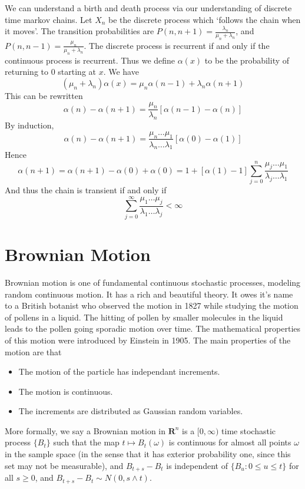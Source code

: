 We can understand a birth and death process via our understanding of discrete time markov chains. Let $X_n$ be the discrete process which `follows the chain when it moves'. The transition probabilities are $P(n,n+1) = \frac{\lambda_n}{\mu_n + \lambda_n}$, and $P(n,n-1) = \frac{\mu_n}{\mu_n + \lambda_n}$. The discrete process is recurrent if and only if the continuous process is recurrent. Thus we define $\alpha(x)$ to be the probability of returning to 0 starting at $x$. We have
%
\[ (\mu_n + \lambda_n) \alpha(x) = \mu_n \alpha(n-1) + \lambda_n \alpha(n+1) \]
%
This can be rewritten
%
\[ \alpha(n) - \alpha(n+1) = \frac{\mu_n}{\lambda_n} [\alpha(n-1) - \alpha(n)] \]
%
By induction,
%
\[ \alpha(n) - \alpha(n+1) = \frac{\mu_n \dots \mu_1}{\lambda_n \dots \lambda_1} [\alpha(0) - \alpha(1)] \]
%
Hence
%
\[ \alpha(n+1) = \alpha(n+1) - \alpha(0) + \alpha(0) = 1 + [\alpha(1) - 1] \sum_{j = 0}^n \frac{\mu_j \dots \mu_1}{\lambda_j \dots \lambda_1} \]
%
And thus the chain is transient if and only if
%
\[ \sum_{j = 0}^\infty \frac{\mu_1 \dots \mu_j}{\lambda_1 \dots \lambda_j} < \infty \]






\chapter{Brownian Motion}

Brownian motion is one of fundamental continuous stochastic processes, modeling random continuous motion. It has a rich and beautiful theory. It owes it's name to a British botanist who observed the motion in 1827 while studying the motion of pollens in a liquid. The hitting of pollen by smaller molecules in the liquid leads to the pollen going sporadic motion over time. The mathematical properties of this motion were introduced by Einstein in 1905. The main properties of the motion are that
%
\begin{itemize}
    \item The motion of the particle has independant increments.
    \item The motion is continuous.
    \item The increments are distributed as Gaussian random variables.
\end{itemize}
%
More formally, we say a Brownian motion in $\mathbf{R}^n$ is a $[0,\infty)$ time stochastic process $\{ B_t \}$ such that the map $t \mapsto B_t(\omega)$ is continuous for almost all points $\omega$ in the sample space (in the sense that it has exterior probability one, since this set may not be measurable), and $B_{t+s} - B_t$ is independent of $\{ B_u: 0 \leq u \leq t \}$ for all $s \geq 0$, and $B_{t+s} - B_t \sim N(0,s \wedge t)$.

